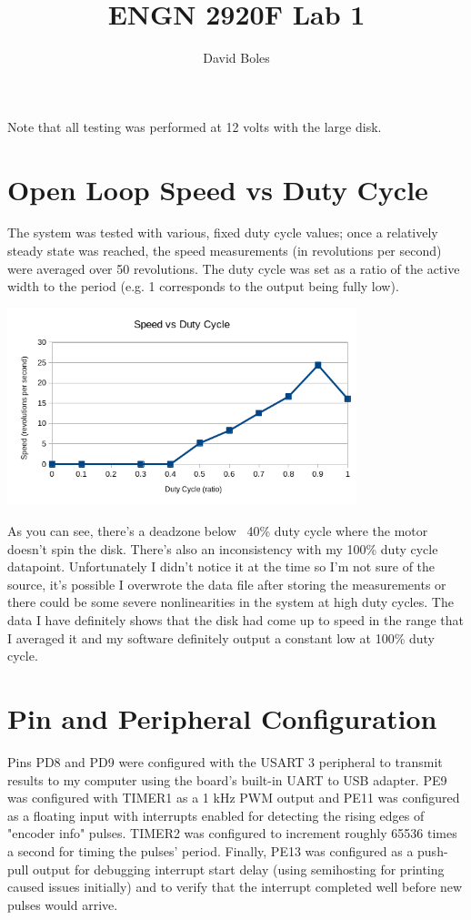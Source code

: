 \documentclass{article}
\title{ENGN 2920F Lab 1}
\author{David Boles}
\date{}
\begin{document}
\maketitle

Note that all testing was performed at 12 volts with the large disk.

\section*{Open Loop Speed vs Duty Cycle}

The system was tested with various, fixed duty cycle values; once a relatively steady state was reached, the speed measurements (in revolutions per second) were averaged over 50 revolutions. The duty cycle was set as a ratio of the active width to the period (e.g. 1 corresponds to the output being fully low).
\begin{center}
  \includegraphics[width=4in]{speed_vs_duty_cycle.png}
\end{center}
As you can see, there's a deadzone below ~40\% duty cycle where the motor doesn't spin the disk. There's also an inconsistency with my 100\% duty cycle datapoint. Unfortunately I didn't notice it at the time so I'm not sure of the source, it's possible I overwrote the data file after storing the measurements or there could be some severe nonlinearities in the system at high duty cycles. The data I have definitely shows that the disk had come up to speed in the range that I averaged it and my software definitely output
a constant low at 100\% duty cycle.



\section*{Pin and Peripheral Configuration}

Pins PD8 and PD9 were configured with the USART 3 peripheral to transmit results to my computer using the board's built-in UART to USB adapter. PE9 was configured with TIMER1 as a 1 kHz PWM output and PE11 was configured as a floating input with interrupts enabled for detecting the rising edges of "encoder info" pulses. TIMER2 was configured to increment roughly 65536 times a second for timing the pulses' period. Finally, PE13 was configured as a push-pull output for debugging interrupt start delay (using semihosting for printing caused issues initially) and to verify that the interrupt completed well before new pulses would arrive.
\end{document}
